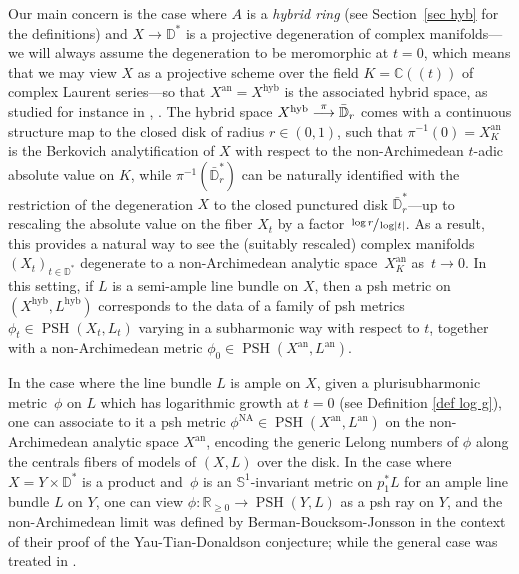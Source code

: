 \documentclass[JEP,XML,SOM,Unicode,published]{cedram}
\newcommand{\To}[1]{\mathchoice{\xrightarrow{\textstyle\kern4pt#1\kern3pt}}{\stackrel{#1}{\longrightarrow}}{}{}}
\newcommand{\lpr}{(\!(}
\newcommand{\rpr}{)\!)}
\theoremstyle{definition}
\newcommand \C{\mathbb C}
\newcommand \D {\mathbb{D}}
\newcommand \R{\mathbb R}
\newcommand \bS {\mathbb S}
\newcommand{\an}{\mathrm{an}}
\newcommand{\hyb}{\mathrm{hyb}}
\DeclareMathOperator{\NA}{NA}
\DeclareMathOperator{\PSH}{PSH}
\begin{document}
Our main concern is the case where $A$ is a \emph{hybrid ring} (see Section~\ref{sec hyb} for the definitions) and $X \to \D^*$ is a projective degeneration of complex manifolds---we will always assume the degeneration to be meromorphic at $t=0$, which means that we may view $X$ as a projective scheme over the field $K = \C\lpr t\rpr$ of complex Laurent series---so that $X^{\an} = X^{\hyb}$ is the associated hybrid space, as studied for instance in \cite{BJ}, \cite{Fav}. The hybrid space $X^{\hyb} \To{\pi} \bar{\D}_r$ comes with a continuous structure map to the closed disk of radius $r \in (0,1)$, such that $\pi^{-1}(0) = X^{\an}_K$ is the Berkovich analytification of $X$ with respect to the non-Archimedean $t$-adic absolute value on $K$, while $\pi^{-1}(\bar{\D}_r^*)$ can be naturally identified with the restriction of the degeneration $X$ to the closed punctured disk $\bar{\D}_r^*$---up to rescaling the absolute value on the fiber $X_t$ by a factor $\sfrac{ \log r }{\log \lvert t \rvert}$. As a result, this provides a natural way to see the (suitably rescaled) complex manifolds $(X_t)_{t \in \D^*}$ degenerate to a non-Archimedean analytic space~$X^{\an}_K$ as~$t\to0$. In this setting, if $L$ is a semi-ample line bundle on $X$, then a psh metric on $(X^{\hyb}, L^{\hyb})$ corresponds to the data of a family of psh metrics $\phi_t \in \PSH(X_t, L_t)$ varying in a subharmonic way with respect to $t$, together with a non-Archimedean metric $\phi_0 \in \PSH(X^{\an}, L^{\an})$.

In the case where the line bundle $L$ is ample on $X$, given a plurisubharmonic metric~$\phi$ on $L$ which has logarithmic growth at $t=0$ (see Definition \ref{def log g}), one can associate to it a psh metric $\phi^{\NA} \in \PSH(X^{\an}, L^{\an})$ on the non-Archimedean analytic space $X^{\an}$, encoding the generic Lelong numbers of $\phi$ along the centrals fibers of models of $(X, L)$ over the disk. In the case where $X = Y \times \D^*$ is a product and~$\phi$ is an $\bS^1$-invariant metric on $p_1^*L$ for an ample line bundle $L$ on $Y$, one can view $\phi: \R_{\ge 0} \to \PSH(Y, L)$ as a psh ray on $Y$, and the non-Archimedean limit was defined by Berman-Boucksom-Jonsson \cite{BBJ} in the context of their proof of the Yau-Tian-Donaldson conjecture; while the general case was treated in \cite{Reb}.
\end{document}
